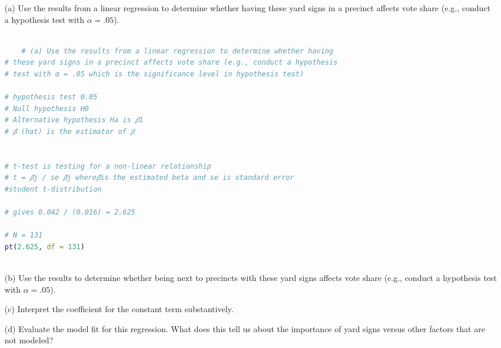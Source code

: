 \documentclass[12pt,letterpaper]{article}
\begin{document}
\vspace{.5cm}
\begin{enumerate}
	\item [(a)] Use the results from a linear regression to determine whether having these yard signs in a precinct affects vote share (e.g., conduct a hypothesis test with $\alpha = .05$).
	
	\begin{lstlisting}[language=R]
	
	# (a) Use the results from a linear regression to determine whether having
# these yard signs in a precinct affects vote share (e.g., conduct a hypothesis
# test with α = .05 which is the significance level in hypothesis test)

# hypothesis test 0.05
# Null hypothesis H0
# Alternative hypothesis Ha is 𝛽1 
# 𝛽̂ (hat) is the estimator of 𝛽


# t-test is testing for a non-linear relationship
# t = 𝛽̂j / se 𝛽̂j where𝛽̂is the estimated beta and se is standard error
#student t-distribution 

# gives 0.042 / (0.016) = 2.625

# N = 131
pt(2.625, df = 131)
	
	\end{lstlisting}
	
	
	\newpage		
	\item [(b)]  Use the results to determine whether being
	next to precincts with these yard signs affects vote
	share (e.g., conduct a hypothesis test with $\alpha = .05$).
	
	\vspace{7cm}
	\item [(c)] Interpret the coefficient for the constant term substantively.
	\vspace{7cm}
	
	\item [(d)] Evaluate the model fit for this regression.  What does this	tell us about the importance of yard signs versus other factors that are not modeled?
	
\end{enumerate}  
\end{document}
